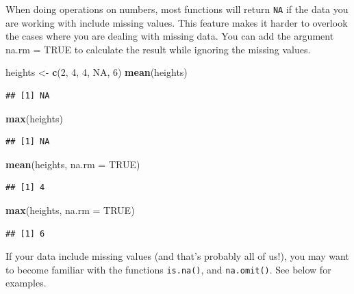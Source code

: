 \documentclass[]{book}
\newenvironment{Shaded}{\begin{snugshade}}{\end{snugshade}}
\newcommand{\DataTypeTok}[1]{\textcolor[rgb]{0.13,0.29,0.53}{#1}}
\newcommand{\DecValTok}[1]{\textcolor[rgb]{0.00,0.00,0.81}{#1}}
\newcommand{\KeywordTok}[1]{\textcolor[rgb]{0.13,0.29,0.53}{\textbf{#1}}}
\newcommand{\NormalTok}[1]{#1}
\newcommand{\OtherTok}[1]{\textcolor[rgb]{0.56,0.35,0.01}{#1}}
\newcommand{\StringTok}[1]{\textcolor[rgb]{0.31,0.60,0.02}{#1}}
\begin{document}
When doing operations on numbers, most functions will return \texttt{NA} if the data you are working with include missing values. This feature makes it harder to overlook the cases where you are dealing with missing data. You can add the argument na.rm = TRUE to calculate the result while ignoring the missing values.

\begin{Shaded}
\begin{Highlighting}[]
\NormalTok{heights <-}\StringTok{ }\KeywordTok{c}\NormalTok{(}\DecValTok{2}\NormalTok{, }\DecValTok{4}\NormalTok{, }\DecValTok{4}\NormalTok{, }\OtherTok{NA}\NormalTok{, }\DecValTok{6}\NormalTok{)}
\KeywordTok{mean}\NormalTok{(heights)}
\end{Highlighting}
\end{Shaded}

\begin{verbatim}
## [1] NA
\end{verbatim}

\begin{Shaded}
\begin{Highlighting}[]
\KeywordTok{max}\NormalTok{(heights)}
\end{Highlighting}
\end{Shaded}

\begin{verbatim}
## [1] NA
\end{verbatim}

\begin{Shaded}
\begin{Highlighting}[]
\KeywordTok{mean}\NormalTok{(heights, }\DataTypeTok{na.rm =} \OtherTok{TRUE}\NormalTok{)}
\end{Highlighting}
\end{Shaded}

\begin{verbatim}
## [1] 4
\end{verbatim}

\begin{Shaded}
\begin{Highlighting}[]
\KeywordTok{max}\NormalTok{(heights, }\DataTypeTok{na.rm =} \OtherTok{TRUE}\NormalTok{)}
\end{Highlighting}
\end{Shaded}

\begin{verbatim}
## [1] 6
\end{verbatim}

If your data include missing values (and that's probably all of us!), you may want to become familiar with the functions \texttt{is.na()}, and \texttt{na.omit()}. See below for examples.
\end{document}
